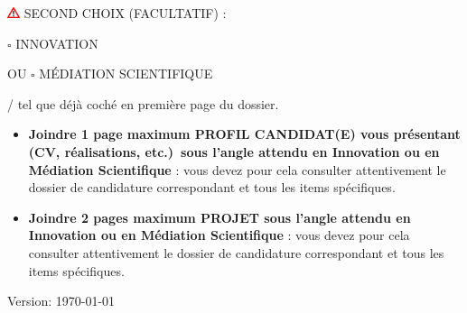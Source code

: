 \documentclass[a4paper,11pt]{article}
\newcommand{\anglaisFrancais}[2]{#2}
\newcommand{\anglaisFrancais}[2]{#1}
\newcommand{\boxunchecked}{$\square$}
\begin{document}
\begin{center}
	\Large
	\includegraphics[width=1em]{warning} \MakeUppercase{\anglaisFrancais{Second choice (optional):}{Second choix (facultatif) :}}

	\bigskip

	\boxunchecked{} \MakeUppercase{Innovation}

	\bigskip

	\MakeUppercase{\anglaisFrancais{or}{ou}} \boxunchecked{} \MakeUppercase{\anglaisFrancais{Scientific mediation}{médiation scientifique}}

	\bigskip

	\small{}/ \anglaisFrancais{as already ticked on the first page of the file}{tel que déjà coché en première page du dossier.}
\end{center}

\bigskip

\begin{itemize}
	\item \anglaisFrancais{%
		\textbf{Attach a maximum of 1 page ``CANDIDATE PROFILE'' presenting yourself (CV, achievements, etc.)\ from the perspective expected in Innovation or Scientific Mediation}: you must carefully consult the corresponding application file and all specific items.
	}{%
		\textbf{Joindre 1 page maximum \og{}PROFIL CANDIDAT(E)\fg{} vous présentant (CV, réalisations, etc.)\ sous l'angle attendu en Innovation ou en Médiation Scientifique} : vous devez pour cela consulter attentivement le dossier de candidature correspondant et tous les items spécifiques.
	}

	\item \anglaisFrancais{\textbf{Attach a maximum of 2 pages ``PROJECT'' under the expected aspect of Innovation or Scientific Mediation}: you must carefully consult the corresponding application file and all specific items ;
	}{%
		\textbf{Joindre 2 pages maximum \og{}PROJET\fg{} sous l'angle attendu en Innovation ou en Médiation Scientifique} : vous devez pour cela consulter attentivement le dossier de candidature correspondant et tous les items spécifiques.
	}
\end{itemize}



\vspace{3cm}
{\tiny \hfill{}\textcolor{black!20}{Version: \today{}}}
\end{document}
